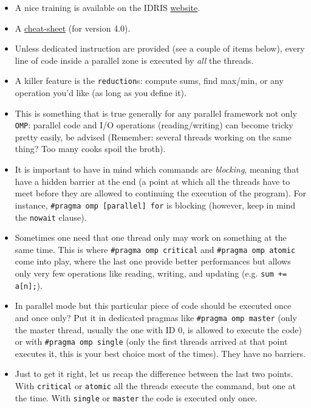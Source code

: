 \documentclass[a4paper,12pt,%
              final%
              ]{article}
\begin{document}
  \begin{itemize}
    \item A nice training is available on the IDRIS \href{http://www.idris.fr/formations/openmp/}{website}.
    \item A \href{https://www.openmp.org/wp-content/uploads/OpenMP-4.0-C.pdf}{cheat-sheet} (for version 4.0).
    \item Unless dedicated instruction are provided (see a couple of items below), every line of code inside a parallel zone is executed by \emph{all} the threads.
    \item A killer feature is the \texttt{reduction}s: compute sums, find max/min, or any operation you'd like (as long as you define it).
    \item This is something that is true generally for any parallel framework not only \texttt{OMP}: parallel code and I/O operations (reading/writing) can become tricky pretty easily, be advised (Remember: several threads working on the same thing? Too many cooks spoil the broth).
    \item It is important to have in mind which commands are \emph{blocking}, meaning that have a hidden barrier at the end (a point at which all the threads have to meet before they are allowed to continuing the execution of the program). For instance, \verb|#pragma omp [parallel] for| is blocking (however, keep in mind the \verb|nowait| clause).
    \item Sometimes one need that one thread only may work on something at the same time. This is where \verb|#pragma omp critical| and \verb|#pragma omp atomic| come into play, where the last one provide better performances but allows only very few operations like reading, writing, and updating (e.g. \verb|sum += a[n];|).
    \item In parallel mode but this particular piece of code should be executed once and once only? Put it in dedicated pragmas like \verb|#pragma omp master| (only the master thread, usually the one with ID 0, is allowed to execute the code) or with \verb|#pragma omp single| (only the first threads arrived at that point executes it, this is your best choice most of the times). They have no barriers.
    \item Just to get it right, let us recap the difference between the last two points. With \texttt{critical} or \texttt{atomic} all the threads execute the command, but one at the time. With \texttt{single} or \texttt{master} the code is executed only once.
  \end{itemize}
\end{document}
